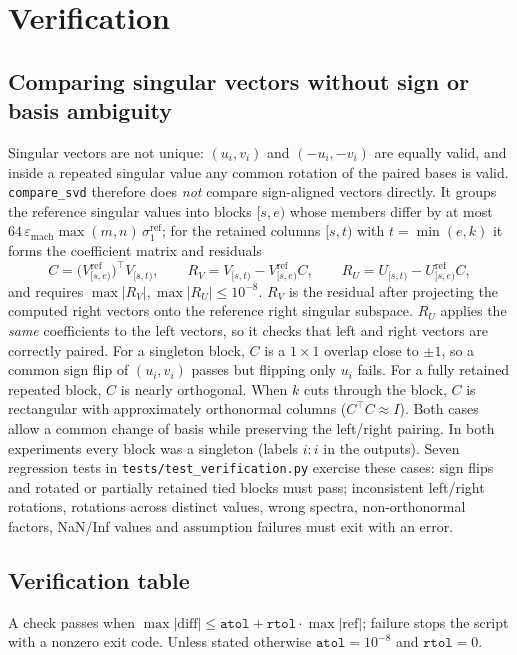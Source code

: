 \documentclass[11pt,letterpaper]{article}
\numberwithin{equation}{section}
\newcommand{\eps}{\varepsilon_{\mathrm{mach}}}
\newcommand{\fn}[1]{\texttt{#1}}
\begin{document}
\section{Verification}\label{sec:verify}

\subsection{Comparing singular vectors without sign or basis ambiguity}
Singular vectors are not unique: $(u_i,v_i)$ and $(-u_i,-v_i)$ are equally valid, and inside a repeated singular value any common rotation of the paired bases is valid. \fn{compare\_svd} therefore does \emph{not} compare sign-aligned vectors directly. It groups the reference singular values into blocks $[s,e)$ whose members differ by at most $64\,\eps\max(m,n)\,\sigma_1^{\text{ref}}$; for the retained columns $[s,t)$ with $t=\min(e,k)$ it forms the coefficient matrix and residuals
\begin{equation}\label{eq:subspace}
C=\big(V^{\text{ref}}_{[s,e)}\big)^{\!\top}V_{[s,t)},\qquad
R_V=V_{[s,t)}-V^{\text{ref}}_{[s,e)}C,\qquad
R_U=U_{[s,t)}-U^{\text{ref}}_{[s,e)}C,
\end{equation}
and requires $\max|R_V|,\max|R_U|\le10^{-8}$. $R_V$ is the residual after projecting the computed right vectors onto the reference right singular subspace. $R_U$ applies the \emph{same} coefficients to the left vectors, so it checks that left and right vectors are correctly paired. For a singleton block, $C$ is a $1\times1$ overlap close to $\pm1$, so a common sign flip of $(u_i,v_i)$ passes but flipping only $u_i$ fails. For a fully retained repeated block, $C$ is nearly orthogonal. When $k$ cuts through the block, $C$ is rectangular with approximately orthonormal columns ($C^\top C\approx I$). Both cases allow a common change of basis while preserving the left/right pairing. In both experiments every block was a singleton (labels $i{:}i$ in the outputs). Seven regression tests in \fn{tests/test\_verification.py} exercise these cases: sign flips and rotated or partially retained tied blocks must pass; inconsistent left/right rotations, rotations across distinct values, wrong spectra, non-orthonormal factors, NaN/Inf values and assumption failures must exit with an error.

\subsection{Verification table}
A check passes when $\max|\text{diff}|\le\texttt{atol}+\texttt{rtol}\cdot\max|\text{ref}|$; failure stops the script with a nonzero exit code. Unless stated otherwise $\texttt{atol}=10^{-8}$ and $\texttt{rtol}=0$.
\end{document}
